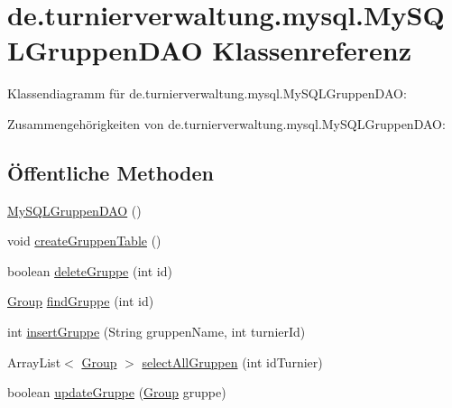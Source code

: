 \hypertarget{classde_1_1turnierverwaltung_1_1mysql_1_1_my_s_q_l_gruppen_d_a_o}{}\section{de.\+turnierverwaltung.\+mysql.\+My\+S\+Q\+L\+Gruppen\+D\+AO Klassenreferenz}
\label{classde_1_1turnierverwaltung_1_1mysql_1_1_my_s_q_l_gruppen_d_a_o}


Klassendiagramm für de.\+turnierverwaltung.\+mysql.\+My\+S\+Q\+L\+Gruppen\+D\+AO\+:


Zusammengehörigkeiten von de.\+turnierverwaltung.\+mysql.\+My\+S\+Q\+L\+Gruppen\+D\+AO\+:
\subsection*{Öffentliche Methoden}
\begin{DoxyCompactItemize}
\item 
\hyperlink{classde_1_1turnierverwaltung_1_1mysql_1_1_my_s_q_l_gruppen_d_a_o_a12da55a45371356d8b0ad9409f5683c9}{My\+S\+Q\+L\+Gruppen\+D\+AO} ()
\item 
void \hyperlink{classde_1_1turnierverwaltung_1_1mysql_1_1_my_s_q_l_gruppen_d_a_o_a5087711cfa0d4952336715b34a2c6884}{create\+Gruppen\+Table} ()
\item 
boolean \hyperlink{classde_1_1turnierverwaltung_1_1mysql_1_1_my_s_q_l_gruppen_d_a_o_a76f001a5b896c9f06b998ccd6a832b66}{delete\+Gruppe} (int id)
\item 
\hyperlink{classde_1_1turnierverwaltung_1_1model_1_1_group}{Group} \hyperlink{classde_1_1turnierverwaltung_1_1mysql_1_1_my_s_q_l_gruppen_d_a_o_a798db525555b0e65793ac6b52f106803}{find\+Gruppe} (int id)
\item 
int \hyperlink{classde_1_1turnierverwaltung_1_1mysql_1_1_my_s_q_l_gruppen_d_a_o_ad0629379e9e5224c2142b288e9fb3733}{insert\+Gruppe} (String gruppen\+Name, int turnier\+Id)
\item 
Array\+List$<$ \hyperlink{classde_1_1turnierverwaltung_1_1model_1_1_group}{Group} $>$ \hyperlink{classde_1_1turnierverwaltung_1_1mysql_1_1_my_s_q_l_gruppen_d_a_o_adb831549d546cf7a2bdf42ac00119e86}{select\+All\+Gruppen} (int id\+Turnier)
\item 
boolean \hyperlink{classde_1_1turnierverwaltung_1_1mysql_1_1_my_s_q_l_gruppen_d_a_o_ae2123eedba71efda38d2f2700d098c32}{update\+Gruppe} (\hyperlink{classde_1_1turnierverwaltung_1_1model_1_1_group}{Group} gruppe)
\end{DoxyCompactItemize}


